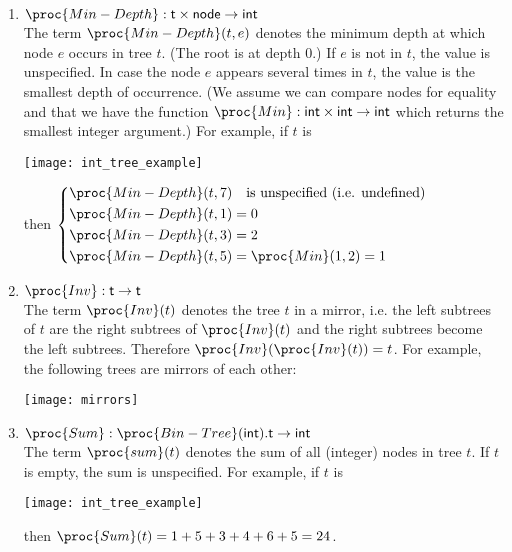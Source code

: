 \documentclass[11pt,a4paper]{article}
\newcommand\type[1]{\textsf{#1}}
\begin{document}
\begin{itemize}
\begin{enumerate}
     \item \(\proc{Min-Depth}: \type{t} \times \type{node} 
     \rightarrow \type{int}\)\\ 
     The term \(\proc{Min-Depth} (t, e)\) denotes the minimum depth at
     which node \(e\) occurs in tree \(t\). (The root is at depth 0.)
     If \(e\) is not in \(t\), the value is unspecified. In case the
     node \(e\) appears several times in \(t\), the value is the
     smallest depth of occurrence. (We assume we can compare nodes for
     equality and that we have the function \(\proc{Min}: \type{int}
     \times \type{int} \rightarrow \type{int}\) which returns the
     smallest integer argument.) For example, if \(t\) is
     \begin{center}
       \texttt{[image: int\_tree\_example]}
     \end{center}
     then \(\left\{ 
     \begin{aligned}
       \proc{Min-Depth} (t, 7) & \quad \text{is unspecified
         (i.e. undefined)}\\
       \proc{Min-Depth} (t, 1) &= 0\\
       \proc{Min-Depth} (t, 3) &= 2\\
       \proc{Min-Depth} (t, 5) &= \proc{Min} (1, 2) = 1
     \end{aligned}
     \right.\)

     \item \(\proc{Inv}: \type{t} \rightarrow \type{t}\)\\ The term
     \(\proc{Inv} (t)\) denotes the tree \(t\) in a mirror, i.e. the
     left subtrees of \(t\) are the right subtrees of \(\proc{Inv}
     (t)\) and the right subtrees become the left
     subtrees. Therefore \(\proc{Inv} (\proc{Inv} (t)) = t\). For
     example, the following trees are mirrors of each other:
     \begin{center}
       \texttt{[image: mirrors]}
     \end{center}

     \item \(\proc{Sum}: \proc{Bin-Tree}(\type{int}).\type{t}
     \rightarrow \type{int}\)\\
     The term \(\proc{sum} (t)\) denotes the sum of all (integer) nodes
     in tree \(t\). If \(t\) is empty, the sum is unspecified. For
     example, if \(t\) is
     \begin{center}
       \texttt{[image: int\_tree\_example]}
     \end{center}
     then \(\proc{Sum} (t) = 1 + 5 + 3 + 4 + 6 + 5 = 24\).

  \end{enumerate}

\end{itemize}




\end{document}

